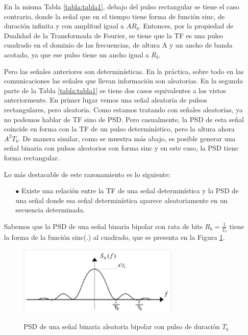 En la misma Tabla \ref{tabla:tabla1}, debajo del pulso rectangular se tiene el caso contrario, donde la señal que en el tiempo tiene forma de función sinc, de duración infinita y con amplitud igual a $A R_b$. Entonces, por la propiedad de Dualidad de la Transformada de Fourier, se tiene que la TF es una pulso cuadrado en el dominio de las frecuencias, de altura A y un ancho de banda acotado, ya que ese pulso tiene un ancho igual a $R_b$. 

Pero las señales anteriores son determinísticas. En la práctica, sobre todo en las comunicaciones las señales que llevan información son aleatorias. En la segunda parte de la Tabla \ref{tabla:tabla1} se tiene dos casos equivalentes a los vistos anteriormente. En primer lugar vemos una señal aleatoria de pulsos rectangulares, pero aleatoria. Como estamos tratando con señales aleatorias, ya no podemos hablar de TF sino de PSD. Pero casualmente, la PSD de esta señal coincide en forma con la TF de un pulso determinístico, pero la altura ahora $A^2 T_b$. 
De manera similar, como se muestra más abajo, es posible generar una señal binaria con pulsos aleatorios con forma sinc y en este caso, la PSD tiene forma rectangular.

Lo más destacable de este razonamiento es lo siguiente:
\begin{itemize}
\item [$\bullet$] Existe una relación entre la TF de una señal determinística y la PSD de una señal donde esa señal determinística aparece aleatoriamente en un secuencia determinada.
\end{itemize}


Sabemos que la PSD de una señal binaria bipolar con rata de bits $R_b=\frac{1}{T_b}$ tiene la forma de la función sinc(.) al cuadrado, que se presenta en la Figura \ref{fig:PSD-ejemplo}. \\

\begin{figure}[h!]
	\captionsetup{justification = raggedright, singlelinecheck = false}
	\caption{PSD de una señal binaria aleatoria bipolar con pulso de duración $T_b$} 
	\centering
	\includegraphics[scale=1]{Imagenes/PSD-ejemplo.png}
	\label{fig:PSD-ejemplo}
\end{figure}


